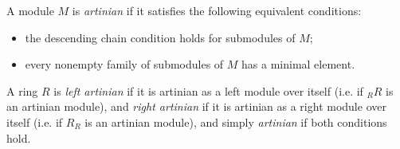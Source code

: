 \documentclass[12pt]{article}
\begin{document}
A module $M$ is {\it artinian} 
if it satisfies the following equivalent conditions:
\begin{itemize}
\item the descending chain condition holds for submodules of $M$;
\item every nonempty family of submodules of $M$ has a minimal element.
\end{itemize}

A ring $R$ is {\it left artinian}
if it is artinian as a left module over itself
(i.e. if $_RR$ is an artinian module),
and {\it right artinian}
if it is artinian as a right module over itself
(i.e. if $R_R$ is an artinian module),
and simply {\it artinian} if both conditions hold.
\end{document}
